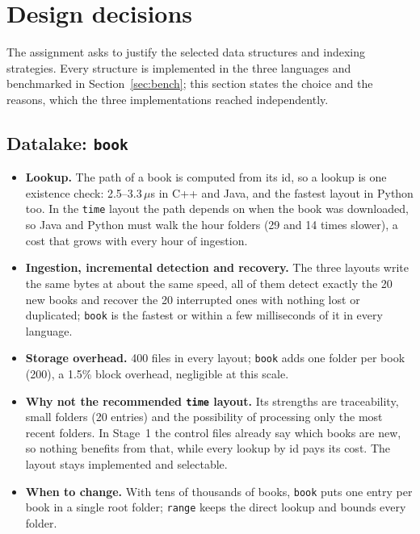 \documentclass[11pt,a4paper]{article}
\newcommand{\code}[1]{\texttt{#1}}
\newcommand{\us}{\,$\mu$s}
\begin{document}
\section{Design decisions}\label{sec:decisions}
The assignment asks to justify the selected data structures and indexing strategies. Every
structure is implemented in the three languages and benchmarked in Section~\ref{sec:bench}; this
section states the choice and the reasons, which the three implementations reached independently.

\subsection{Datalake: \code{book}}
\begin{itemize}
  \item \textbf{Lookup.} The path of a book is computed from its id, so a lookup is one existence
        check: 2.5--3.3\us{} in C++ and Java, and the fastest layout in Python too. In the
        \code{time} layout the path depends on when the book was downloaded, so Java and Python must
        walk the hour folders (29 and 14 times slower), a cost that grows with every hour of
        ingestion.
  \item \textbf{Ingestion, incremental detection and recovery.} The three layouts write the same bytes
        at about the same speed, all of them detect exactly the 20 new books and recover the 20
        interrupted ones with nothing lost or duplicated; \code{book} is the fastest or within a few
        milliseconds of it in every language.
  \item \textbf{Storage overhead.} 400 files in every layout; \code{book} adds one folder per book
        (200), a 1.5\% block overhead, negligible at this scale.
  \item \textbf{Why not the recommended \code{time} layout.} Its strengths are traceability, small
        folders (20 entries) and the possibility of processing only the most recent folders. In
        Stage~1 the control files already say which books are new, so nothing benefits from that, while
        every lookup by id pays its cost. The layout stays implemented and selectable.
  \item \textbf{When to change.} With tens of thousands of books, \code{book} puts one entry per book
        in a single root folder; \code{range} keeps the direct lookup and bounds every folder.
\end{itemize}
\end{document}
